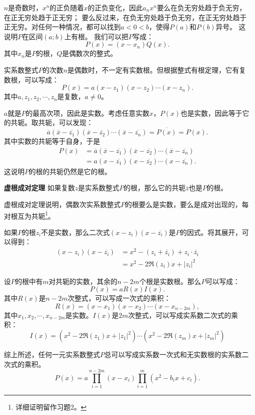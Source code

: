 \documentclass[12pt,UTF8]{ctexbook}
\begin{document}
\begin{appendix}
$n$是奇数时，$x^n$的正负随着$x$的正负变化，因此$a_nx^n$要么在负无穷处趋于负无穷，在正无穷处趋于正无穷；
要么反过来，在负无穷处趋于负无穷，在正无穷处趋于正无穷。对任何一种情况，都可以找到$a<0<b$，使得$P(a)$和$P(b)$异号。
这说明$P$在区间$(a;b)$上有根。
我们可以把$P$写成：
$$ P(x) = (x - x_n)Q(x).$$
其中$x_n$是$P$的根，$Q$是偶数次的整式。

实系数整式$P$的次数$n$是偶数时，不一定有实数根。但根据整式有根定理，它有复数根，可以写成：
$$ P(x) = a(x - z_1)(x - z_2)\cdots(x - z_n).$$
其中$a, z_1, z_2,\cdots, z_n$是复数，$a\neq 0$。

$a$就是$P$的最高次项，因此是实数。考虑任意实数$x$，$P(x)$也是实数，因此等于它的共轭。取共轭，可以发现：
$$ \overline{a}(\overline{x} - \overline{z_1})(\overline{x} - \overline{z_2})\cdots(\overline{x} - \overline{z_n}) = \overline{P(x)} = P(x).$$
其中实数的共轭等于自身，于是
\begin{align*}
    P(x) &= \overline{a}(\overline{x} - \overline{z_1})(\overline{x} - \overline{z_2})\cdots(\overline{x} - \overline{z_n}) \\
    &= a(x - \overline{z_1})(x - \overline{z_2})\cdots(x - \overline{z_n}). 
\end{align*}
这说明$P$的根的共轭仍然是它的根。
\begin{tm}{\textbf{虚根成对定理}}
    如果复数$z$是实系数整式$P$的根，那么它的共轭$\overline{z}$也是$P$的根。
\end{tm}
虚根成对定理说明，偶数次实系数整式$P$的根要么是实数，要么是成对出现的，每对根互为共轭\footnote{详细证明留作习题2。}。
  
如果$P$的根$z_i$不是实数，那么二次式$(x - z_i)(x - \overline{z_i})$是$P$的因式。将其展开，可以得到：
\begin{align*}
    (x - z_i)(x - \overline{z_i}) &= x^2 - (z_i + \overline{z_i}) + z_i\cdot\overline{z_i} \\
    &= x^2 - 2\Re(z_i)x + |z_i|^2
\end{align*}

设$P$的根中有$m$对共轭的实数，其余的$n-2m$个根是实数根。那么$P$可以写成：
$$ P(x) = aR(x)I(x).$$
其中$R(x)$是$n-2m$次整式，可以写成一次式的乘积：
$$ R(x) = (x - x_1)(x - x_2)\cdots(x - x_{n-2m}), $$
其中$x_1, x_2, \cdots, x_{n-2m}$是实数。$I(x)$是$2m$次整式，可以写成实系数二次式的乘积：
$$ I(x) = (x^2 - 2\Re(z_1)x + |z_1|^2) \cdots (x^2 - 2\Re(z_m)x + |z_m|^2)$$

综上所述，任何一元实系数整式$P$总可以写成实系数一次式和无实数根的实系数二次式的乘积。
$$ P(x) = a\prod_{i=1}^{n-2m}(x - x_i) \prod_{i=1}^m (x^2 - b_ix + c_i). $$


\end{appendix}
\end{document}
